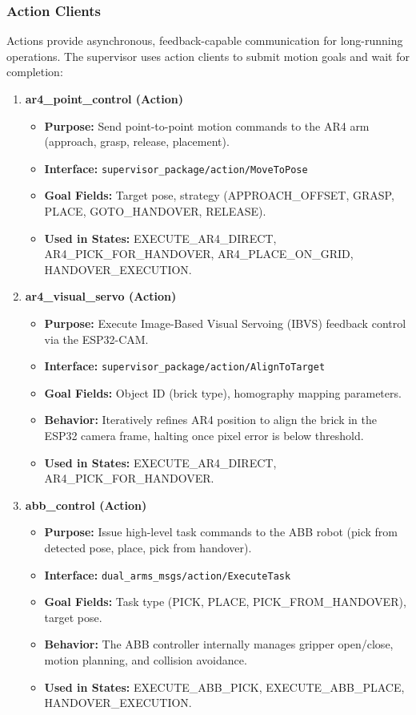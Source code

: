\subsubsection{Action Clients}

Actions provide asynchronous, feedback-capable communication for long-running operations. The supervisor uses action clients to submit motion goals and wait for completion:

\begin{enumerate}
    \item \textbf{ar4\_point\_control (Action)}
    \begin{itemize}
        \item \textbf{Purpose:} Send point-to-point motion commands to the AR4 arm (approach, grasp, release, placement).
        \item \textbf{Interface:} \texttt{supervisor\_package/action/MoveToPose}
        \item \textbf{Goal Fields:} Target pose, strategy (APPROACH\_OFFSET, GRASP, PLACE, GOTO\_HANDOVER, RELEASE).
        \item \textbf{Used in States:} EXECUTE\_AR4\_DIRECT, AR4\_PICK\_FOR\_HANDOVER, AR4\_PLACE\_ON\_GRID, HANDOVER\_EXECUTION.
    \end{itemize}

    \item \textbf{ar4\_visual\_servo (Action)}
    \begin{itemize}
        \item \textbf{Purpose:} Execute Image-Based Visual Servoing (IBVS) feedback control via the ESP32-CAM.
        \item \textbf{Interface:} \texttt{supervisor\_package/action/AlignToTarget}
        \item \textbf{Goal Fields:} Object ID (brick type), homography mapping parameters.
        \item \textbf{Behavior:} Iteratively refines AR4 position to align the brick in the ESP32 camera frame, halting once pixel error is below threshold.
        \item \textbf{Used in States:} EXECUTE\_AR4\_DIRECT, AR4\_PICK\_FOR\_HANDOVER.
    \end{itemize}

    \item \textbf{abb\_control (Action)}
    \begin{itemize}
        \item \textbf{Purpose:} Issue high-level task commands to the ABB robot (pick from detected pose, place, pick from handover).
        \item \textbf{Interface:} \texttt{dual\_arms\_msgs/action/ExecuteTask}
        \item \textbf{Goal Fields:} Task type (PICK, PLACE, PICK\_FROM\_HANDOVER), target pose.
        \item \textbf{Behavior:} The ABB controller internally manages gripper open/close, motion planning, and collision avoidance.
        \item \textbf{Used in States:} EXECUTE\_ABB\_PICK, EXECUTE\_ABB\_PLACE, HANDOVER\_EXECUTION.
    \end{itemize}
\end{enumerate}

